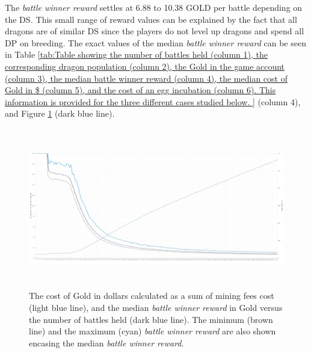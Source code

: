 \documentclass[12pt]{article}
\begin{document}
{%


The \textit{battle winner reward} settles at 6.88 to 10.38 GOLD per battle depending on the DS\textit{.} This small range of reward values can be explained by the fact that all dragons are of similar DS since the players do not level up dragons and spend all DP on breeding. The exact values of the median \textit{battle winner reward }can be seen in  Table \ref{tab:Table showing the number of battles held (column 1), the corresponding dragon population (column 2), the Gold in the game account (column 3), the median battle winner reward (column 4), the median cost of Gold in $ (column 5), and the cost of an egg incubation (column 6).  This information is provided for the three different cases studied below. } (column 4), and Figure \ref{fig:The cost of Gold in dollars calculated as a sum of mining fees cost (light blue line), and the median battle reward in Gold versus the number of battles held (dark blue line).} (dark blue line).\par




\begin{figure}[H]
	\begin{Center}
		\includegraphics[width=6.27in,height=2.76in]{./media/CS1nimage23.png}
		\caption{The cost of Gold in dollars calculated as a sum of mining fees cost (light blue line), and the median {\it battle winner reward} in Gold versus the number of battles held (dark blue line).  The minimum (brown line) and the maximum (cyan) {\it battle winner reward} are also shown encasing the median {\it battle winner reward}.}
		\label{fig:The cost of Gold in dollars calculated as a sum of mining fees cost (light blue line), and the median battle reward in Gold versus the number of battles held (dark blue line).}
	\end{Center}
\end{figure}


}
\end{document}
